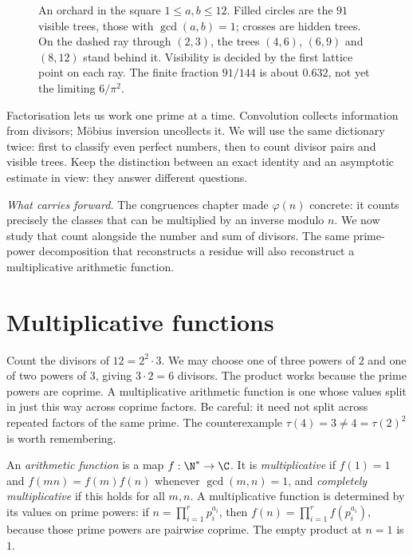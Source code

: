 \begin{figure}[ht]
\centering
{}
\caption{An orchard in the square $1\le a,b\le12$. Filled circles are the
$91$ visible trees, those with $\gcd(a,b)=1$; crosses are hidden trees. On the
dashed ray through $(2,3)$, the trees $(4,6)$, $(6,9)$ and $(8,12)$ stand behind
it. Visibility is decided by the first lattice point on each ray. The finite
fraction $91/144$ is about $0.632$, not yet the limiting $6/\pi^2$.}
\label{fig:orchard}
\end{figure}

\begin{reminder}
Factorisation lets us work one prime at a time. Convolution collects information
from divisors; M\"obius inversion uncollects it. We will use the same dictionary
twice: first to classify even perfect numbers, then to count divisor pairs and
visible trees. Keep the distinction between an exact identity and an asymptotic
estimate in view: they answer different questions.
\end{reminder}

\noindent\emph{What carries forward.} The congruences chapter made $\varphi(n)$ concrete: it counts precisely the classes that can be multiplied by an inverse modulo $n$. We now study that count alongside the number and sum of divisors. The same prime-power decomposition that reconstructs a residue will also reconstruct a multiplicative arithmetic function.

\section{Multiplicative functions}

Count the divisors of $12=2^2\cdot3$. We may choose one of three powers of $2$ and one of two powers of $3$, giving $3\cdot2=6$ divisors. The product works because the prime powers are coprime. A multiplicative arithmetic function is one whose values split in just this way across coprime factors. Be careful: it need not split across repeated factors of the same prime. The counterexample $\tau(4)=3\ne4=\tau(2)^2$ is worth remembering.

An \emph{arithmetic function} is a map $f:\N^*\to\C$. It is \emph{multiplicative} if $f(1)=1$ and $f(mn)=f(m)f(n)$ whenever $\gcd(m,n)=1$, and \emph{completely multiplicative} if this holds for all $m,n$. A multiplicative function is determined by its values on prime powers:
if $n=\prod_{i=1}^r p_i^{a_i}$, then $f(n)=\prod_{i=1}^r f(p_i^{a_i})$,
because those prime powers are pairwise coprime. The empty product at $n=1$
is $1$.

